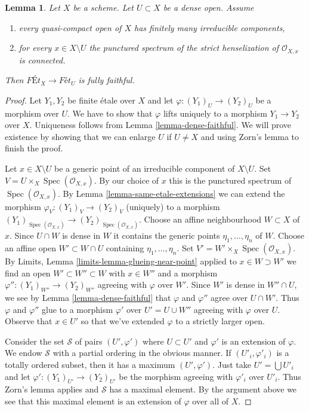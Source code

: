 \documentclass{stacks-project}
\theoremstyle{plain}
\newtheorem{lemma}[subsection]{Lemma}
\theoremstyle{definition}
\theoremstyle{remark}
\numberwithin{equation}{subsection}
\def\Spec{\mathop{\mathrm{Spec}}}
\begin{document}
\begin{lemma}
\label{lemma-quasi-compact-dense-open-connected-at-infinity}
Let $X$ be a scheme. Let $U \subset X$ be a dense open. Assume
\begin{enumerate}
\item every quasi-compact open of $X$ has finitely many
irreducible components,
\item for every $x \in X \setminus U$ the punctured spectrum of the
strict henselization of $\mathcal{O}_{X, x}$ is connected.
\end{enumerate}
Then $\textit{F\'Et}_X \to \textit{F\'et}_U$ is fully faithful.
\end{lemma}

\begin{proof}
Let $Y_1, Y_2$ be finite \'etale over $X$ and let
$\varphi : (Y_1)_U \to (Y_2)_U$ be a morphism over $U$. We have to show that
$\varphi$ lifts uniquely to a morphism $Y_1 \to Y_2$ over $X$.
Uniqueness follows from Lemma \ref{lemma-dense-faithful}.
We will prove existence by showing that we can enlarge $U$
if $U \not = X$ and using Zorn's lemma to finish the proof.

\medskip\noindent
Let $x \in X \setminus U$ be a generic point of an irreducible component
of $X \setminus U$. Set $V = U \times_X \Spec(\mathcal{O}_{X, x})$.
By our choice of $x$ this is the punctured spectrum of
$\Spec(\mathcal{O}_{X, x})$. By
Lemma \ref{lemma-same-etale-extensions}
we can extend the morphism $\varphi_V : (Y_1)_V \to (Y_2)_V$
(uniquely) to a morphism
$(Y_1)_{\Spec(\mathcal{O}_{X, x})} \to (Y_2)_{\Spec(\mathcal{O}_{X, x})}$.
Choose an affine neighbourhood $W \subset X$ of $x$.
Since $U \cap W$ is dense in $W$ it contains the generic points
$\eta_1, \ldots, \eta_n$ of $W$. Choose an affine open
$W' \subset W \cap U$ containing $\eta_1, \ldots, \eta_n$.
Set $V' = W' \times_X \Spec(\mathcal{O}_{X, x})$.
By Limits, Lemma \ref{limits-lemma-glueing-near-point}
applied to $x \in W \supset W'$
we find an open $W' \subset W'' \subset W$ with $x \in W''$
and a morphism $\varphi'' : (Y_1)_{W''} \to (Y_2)_{W''}$
agreeing with $\varphi$ over $W'$. Since $W'$ is dense in
$W'' \cap U$, we see by Lemma \ref{lemma-dense-faithful}
that $\varphi$ and $\varphi''$ agree over $U \cap W'$.
Thus $\varphi$ and $\varphi''$ glue to a morphism
$\varphi'$ over $U' = U \cup W''$ agreeing with $\varphi$ over $U$.
Observe that $x \in U'$ so that we've extended $\varphi$
to a strictly larger open.

\medskip\noindent
Consider the set $\mathcal{S}$ of pairs $(U', \varphi')$ where $U \subset U'$
and $\varphi'$ is an extension of $\varphi$. We endow $\mathcal{S}$
with a partial ordering in the obvious manner. If $(U'_i, \varphi'_i)$
is a totally ordered subset, then it has a maximum $(U', \varphi')$.
Just take $U' = \bigcup U'_i$ and let
$\varphi' : (Y_1)_{U'} \to (Y_2)_{U'}$ be the morphism
agreeing with $\varphi'_i$ over $U'_i$. Thus Zorn's lemma applies
and $\mathcal{S}$ has a maximal element. By the argument above
we see that this maximal element is an extension of $\varphi$
over all of $X$.
\end{proof}
\end{document}
